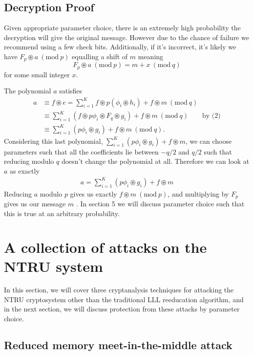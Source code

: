 \documentclass[12pt]{amsart}
\theoremstyle{definition}
\theoremstyle{remark}
\newcommand{\Mod}[1]{\ (\mathrm{mod}\ #1)}
\begin{document}
\subsection{Decryption Proof}
Given appropriate parameter choice, there is an extremely high probability the decryption will give the original message. However due to the chance of failure we recommend using a few check bits. Additionally, if it's incorrect, it's likely we have $F_p\circledast a \Mod{p}$ equalling a shift of $m$ meaning 
$$F_p\circledast a \Mod{p} = m + x \Mod{q}$$
for some small integer $x$.\cite{NTRUpatent}

The polynomial $a$ satisfies
\begin{align*}
    a &\equiv f\circledast e = \sum_{i=1}^K f\circledast p(\phi_i\circledast h_i) + f\circledast m \Mod{q}\\
    &\equiv \sum_{i=1}^K (f\circledast p\phi_i\circledast F_q \circledast g_i) + f\circledast m \Mod{q} \qquad
    \text{by (2)}\\
    &\equiv \sum_{i=1}^K (p\phi_i\circledast g_i) + f\circledast m \Mod{q}.
\end{align*}
Considering this last polynomial, $\sum_{i=1}^K (p\phi_i\circledast g_i) + f\circledast m$, we can choose parameters such that all the coefficients lie between $-q/2$ and $q/2$ such that reducing modulo $q$ doesn't change the polynomial at all. Therefore we can look at $a$ as exactly
\begin{align*}
    a = \sum_{i=1}^K (p\phi_i\circledast g_i) + f\circledast m
\end{align*}
Reducing $a$ modulo $p$ gives us exactly $f\circledast m \Mod{p}$, and multiplying by $F_p$ gives us our message $m$ \cite{NTRUpatent}. In section 5 we will discuss parameter choice such that this is true at an arbitrary probability.

\section{A collection of attacks on the NTRU system}

In this section, we will cover three cryptanalysis techniques for attacking the NTRU cryptosystem other than the traditional LLL reeducation algorithm, and in the next section, we will discuss protection from these attacks by parameter choice.

\subsection{Reduced memory meet-in-the-middle attack} 
\end{document}
